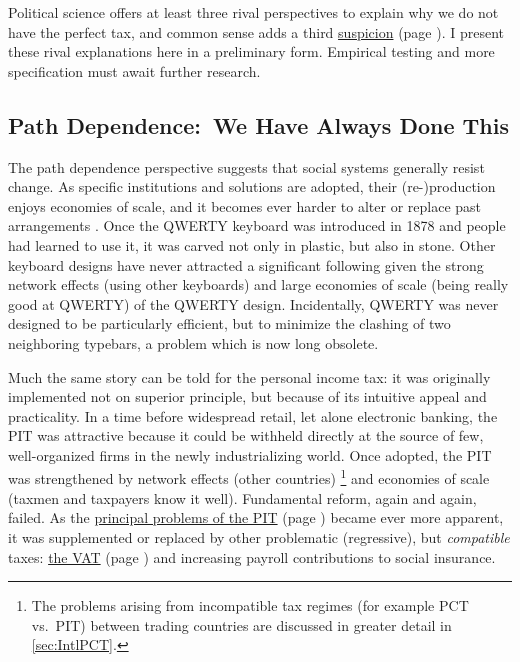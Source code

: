 
Political science offers at least three rival perspectives to explain why we do not have the perfect tax, and common sense adds a third \hyperref[sec:Conspiracy]{suspicion} (page \pageref{sec:Conspiracy}).
I present these rival explanations here in a preliminary form.
Empirical testing and more specification must await further research.

\subsection[Path Dependence]{Path Dependence:\ We Have Always Done This} The path dependence perspective suggests that social systems generally resist change.
As specific institutions and solutions are adopted, their (re-)production enjoys economies of scale, and it becomes ever harder to alter or replace past arrangements \citep{Mahoney-2000-aa,Pierson-2000-aa}.
Once the QWERTY keyboard was introduced in 1878 and people had learned to use it, it was carved not only in plastic, but also in stone.
Other keyboard designs have never attracted a significant following given the strong network effects (using other keyboards) and large economies of scale (being really good at QWERTY) of the QWERTY design.
Incidentally, QWERTY was never designed to be particularly efficient, but to minimize the clashing of two neighboring typebars, a problem which is now long obsolete.

Much the same story can be told for the personal income tax:
it was originally implemented not on superior principle, but because of its intuitive appeal and practicality.
In a time before widespread retail, let alone electronic banking, the PIT was attractive because it could be withheld directly at the source of few, well-organized firms in the newly industrializing world.
Once adopted, the PIT was strengthened by network effects (other countries)
\footnote{
	The problems arising from incompatible tax regimes (for example PCT vs.\ PIT) between trading countries are discussed in greater detail in \autoref{sec:IntlPCT}.
}
and economies of scale (taxmen and taxpayers know it well).
Fundamental reform, again and again, failed.
As the \hyperref[sec:ScorePIT]{principal problems of the PIT} (page \pageref{sec:ScorePIT}) became ever more apparent, it was supplemented or replaced by other problematic (regressive), but \emph{compatible} taxes:
\hyperref[sec:ScoreVAT]{the VAT} (page \pageref{sec:ScoreVAT}) and increasing payroll contributions to social insurance.

